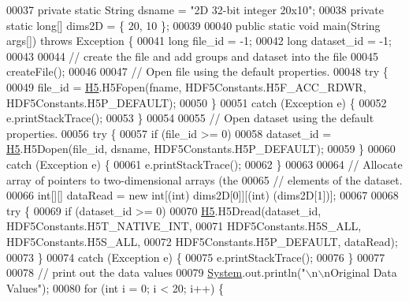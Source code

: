 \begin{DoxyCode}
00037     \textcolor{keyword}{private} \textcolor{keyword}{static} String dsname  = \textcolor{stringliteral}{"2D 32-bit integer 20x10"};
00038     \textcolor{keyword}{private} \textcolor{keyword}{static} \textcolor{keywordtype}{long}[] dims2D = \{ 20, 10 \};
00039 
00040     \textcolor{keyword}{public} \textcolor{keyword}{static} \textcolor{keywordtype}{void} main(String args[]) \textcolor{keywordflow}{throws} Exception \{
00041         \textcolor{keywordtype}{long} file\_id = -1;
00042         \textcolor{keywordtype}{long} dataset\_id = -1;
00043 
00044         \textcolor{comment}{// create the file and add groups and dataset into the file}
00045         createFile();
00046 
00047         \textcolor{comment}{// Open file using the default properties.}
00048         \textcolor{keywordflow}{try} \{
00049             file\_id = \hyperlink{namespace_h5}{H5}.H5Fopen(fname, HDF5Constants.H5F\_ACC\_RDWR, HDF5Constants.H5P\_DEFAULT);
00050         \}
00051         \textcolor{keywordflow}{catch} (Exception e) \{
00052             e.printStackTrace();
00053         \}
00054 
00055         \textcolor{comment}{// Open dataset using the default properties.}
00056         \textcolor{keywordflow}{try} \{
00057             \textcolor{keywordflow}{if} (file\_id >= 0)
00058                 dataset\_id = \hyperlink{namespace_h5}{H5}.H5Dopen(file\_id, dsname, HDF5Constants.H5P\_DEFAULT);
00059         \}
00060         \textcolor{keywordflow}{catch} (Exception e) \{
00061             e.printStackTrace();
00062         \}
00063 
00064         \textcolor{comment}{// Allocate array of pointers to two-dimensional arrays (the}
00065         \textcolor{comment}{// elements of the dataset.}
00066         \textcolor{keywordtype}{int}[][] dataRead = \textcolor{keyword}{new} \textcolor{keywordtype}{int}[(int) dims2D[0]][(\textcolor{keywordtype}{int}) (dims2D[1])];
00067 
00068         \textcolor{keywordflow}{try} \{
00069             \textcolor{keywordflow}{if} (dataset\_id >= 0)
00070                 \hyperlink{namespace_h5}{H5}.H5Dread(dataset\_id, HDF5Constants.H5T\_NATIVE\_INT,
00071                         HDF5Constants.H5S\_ALL, HDF5Constants.H5S\_ALL,
00072                         HDF5Constants.H5P\_DEFAULT, dataRead);
00073         \}
00074         \textcolor{keywordflow}{catch} (Exception e) \{
00075             e.printStackTrace();
00076         \}
00077 
00078         \textcolor{comment}{// print out the data values}
00079         \hyperlink{namespace_system}{System}.out.println(\textcolor{stringliteral}{"\(\backslash\)n\(\backslash\)nOriginal Data Values"});
00080         \textcolor{keywordflow}{for} (\textcolor{keywordtype}{int} i = 0; i < 20; i++) \{

\end{DoxyCode}
